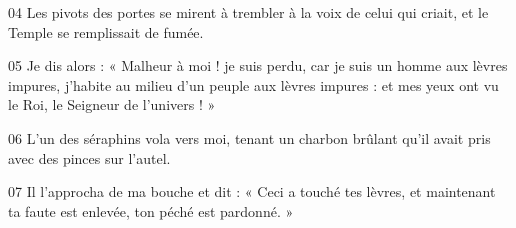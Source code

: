 
04 Les pivots des portes se mirent à trembler à la voix de celui qui criait, et le Temple se remplissait de fumée.

05 Je dis alors : « Malheur à moi ! je suis perdu, car je suis un homme aux lèvres impures, j’habite au milieu d’un peuple aux lèvres impures : et mes yeux ont vu le Roi, le Seigneur de l’univers ! »

06 L’un des séraphins vola vers moi, tenant un charbon brûlant qu’il avait pris avec des pinces sur l’autel.

07 Il l’approcha de ma bouche et dit : « Ceci a touché tes lèvres, et maintenant ta faute est enlevée, ton péché est pardonné. »
